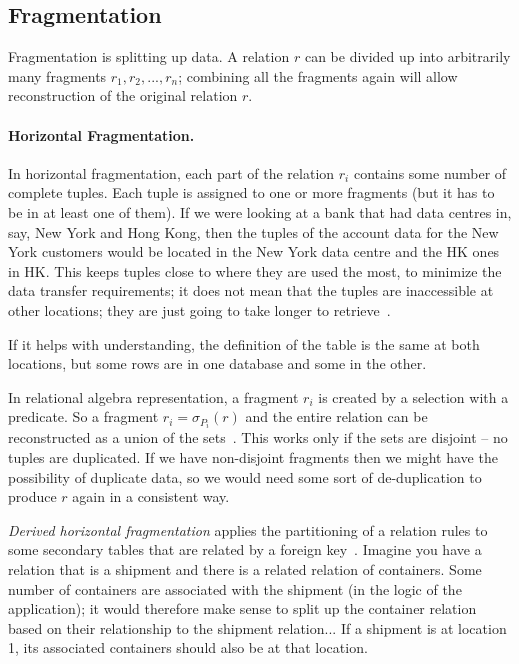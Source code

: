 \documentclass[a4paper]{report}
\begin{document}
\subsection*{Fragmentation}

Fragmentation is splitting up data. A relation $r$ can be divided up into arbitrarily many fragments $r_{1}, r_{2}, ..., r_{n}$; combining all the fragments again will allow reconstruction of the original relation $r$. 

\paragraph{Horizontal Fragmentation.} In horizontal fragmentation, each part of the relation $r_{i}$ contains some number of complete tuples. Each tuple is assigned to one or more fragments (but it has to be in at least one of them). If we were looking at a bank that had data centres in, say, New York and Hong Kong, then the tuples of the account data for the New York customers would be located in the New York data centre and the HK ones in HK. This keeps tuples close to where they are used the most, to minimize the data transfer requirements; it does not mean that the tuples are inaccessible at other locations; they are just going to take longer to retrieve~\cite{dsc}.

If it helps with understanding, the definition of the table is the same at both locations, but some rows are in one database and some in the other.

In relational algebra representation, a fragment $r_{i}$ is created by a selection with a predicate. So a fragment $r_{i} = \sigma_{P_{i}}(r)$ and the entire relation can be reconstructed as a union of the sets~\cite{dsc}. This works only if the sets are disjoint -- no tuples are duplicated. If we have non-disjoint fragments then we might have the possibility of duplicate data, so we would need some sort of de-duplication to produce $r$ again in a consistent way.

\textit{Derived horizontal fragmentation} applies the partitioning of a relation rules to some secondary tables that are related by a foreign key~\cite{fds}. Imagine you have a relation that is a shipment and there is a related relation of containers. Some number of containers are associated with the shipment (in the logic of the application); it would therefore make sense to split up the container relation based on their relationship to the shipment relation... If a shipment is at location 1, its associated containers should also be at that location.
\end{document}
